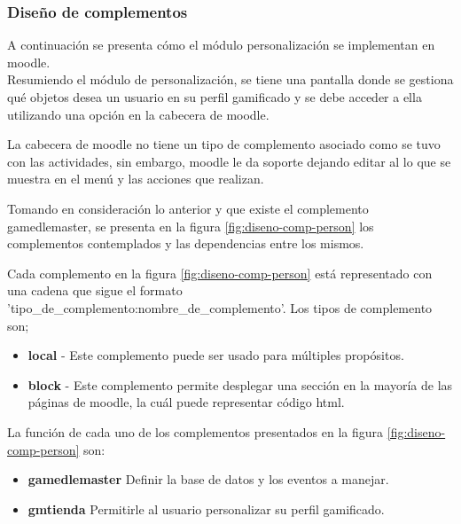 

\subsubsection{Diseño de complementos}



A continuación se presenta cómo el módulo personalización
se implementan en moodle.\\


\noindent Resumiendo el módulo de personalización, se  tiene una pantalla donde se gestiona qué objetos
desea un usuario en su perfil gamificado
y se debe acceder a ella utilizando una opción en la cabecera de moodle.

La cabecera de moodle no tiene un tipo de complemento asociado como se tuvo con las actividades, sin embargo,
 moodle le da soporte dejando editar al 
lo que se muestra en el menú y las acciones que realizan.

\noindent Tomando en consideración lo anterior y que existe el complemento gamedlemaster, se presenta en la figura \ref{fig:diseno-comp-person}
los complementos contemplados y las dependencias entre los mismos.




Cada complemento en la figura \ref{fig:diseno-comp-person} está representado con una cadena que sigue el formato 'tipo\_de\_complemento:nombre\_de\_complemento'.
Los tipos de complemento son;
\begin{itemize}
    \item \textbf{local} -  Este complemento puede ser usado para múltiples propósitos.
    \item \textbf{block} - Este complemento permite desplegar una sección en la mayoría de las páginas de moodle, la cuál puede representar código html.
\end{itemize}

La función de cada uno de los complementos presentados en la figura \ref{fig:diseno-comp-person} son:


\begin{itemize}
    \item \textbf{gamedlemaster} Definir la base de datos y los eventos a manejar.
    \item \textbf{gmtienda} Permitirle al usuario personalizar su perfil gamificado.
\end{itemize}
